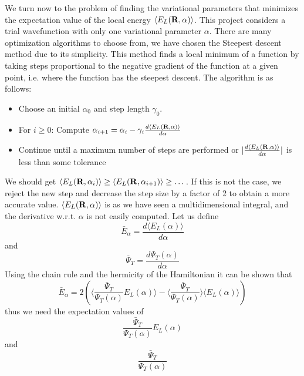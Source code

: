 \documentclass[english, a4paper]{article}
\begin{document}
We turn now to the problem of finding the variational parameters that minimizes the expectation value
of the local energy $\langle E_L({\bf R}, \alpha) \rangle$. This project considers a trial wavefunction with only one 
variational parameter $\alpha$.
There are many optimization algorithms to choose from, we have chosen the Steepest 
descent method due to its simplicity. This method finds a local minimum of a function by taking steps proportional 
to the negative gradient of the function at a given point, i.e. where the function has the steepest descent.
The algorithm is as follows:
\begin{itemize}
 \item Choose an initial $\alpha_0$ and step length $\gamma_0$.
 \item For $i \geq 0$: Compute $\alpha_{i+1} = \alpha_i - \gamma_i \frac{d \langle E_L({\bf R}, \alpha) \rangle}{d\alpha}$
 \item Continue until a maximum number of steps are performed or 
 $|\frac{d \langle E_L({\bf R}, \alpha) \rangle}{d\alpha}|$ is 
       less than some tolerance
\end{itemize}
We should get $\langle E_L({\bf R}, \alpha_i) \rangle \geq \langle E_L({\bf R}, \alpha_{i+1}) \rangle \geq \dots$.
If this is not the case, we reject the new step and decrease the step size by a factor of 2 to obtain a more
accurate value. 
$\langle E_L({\bf R}, \alpha) \rangle$ is as we have seen a multidimensional integral, and the derivative w.r.t. $\alpha$
is not easily computed. Let us define
\begin{equation}
 \bar{E}_\alpha = \frac{d \langle E_L(\alpha) \rangle}{d\alpha}
\end{equation}
and 
\begin{equation}
 \bar{\Psi}_T = \frac{d \Psi_T(\alpha)}{d\alpha}
\end{equation}
Using the chain rule and the hermicity of the Hamiltonian it can be shown that
\begin{equation}
 \bar{E}_\alpha = 2 \left( \Bigr\langle \frac{\bar{\Psi}_T}{\Psi_T(\alpha)} E_L(\alpha) \Bigr\rangle 
 - \Bigr\langle \frac{\bar{\Psi}_T}{\Psi_T(\alpha)}\Bigr\rangle \langle E_L(\alpha) \rangle   \right)
 \label{localenergyalpha}
\end{equation}
thus we need the expectation values of
\begin{equation}
 \frac{\bar{\Psi}_T}{\Psi_T(\alpha)} E_L(\alpha)
 \label{waveenergy}
\end{equation}
and 
\begin{equation}
 \frac{\bar{\Psi}_T}{\Psi_T(\alpha)}
 \label{wavederivative}
\end{equation}
\end{document}
